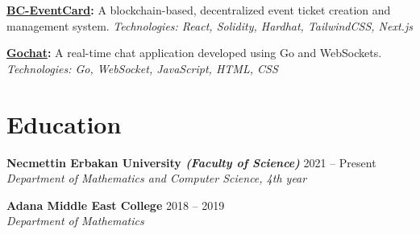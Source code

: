 \documentclass[10pt,a4paper]{extarticle}
\begin{document}
\vspace{5pt}
\noindent\textbf{\href{https://github.com/faust-lvii/BC-EventCard}{BC-EventCard}:} A blockchain-based, decentralized event ticket creation and management system. \textit{Technologies: React, Solidity, Hardhat, TailwindCSS, Next.js}

\vspace{5pt}
\noindent\textbf{\href{https://github.com/faust-lvii/gochat}{Gochat}:} A real-time chat application developed using Go and WebSockets. \textit{Technologies: Go, WebSocket, JavaScript, HTML, CSS}

\vspace{10pt}

\section{Education}
\textbf{Necmettin Erbakan University \textit{(Faculty of Science)}} \hfill 2021 -- Present\\
\textit{Department of Mathematics and Computer Science, 4th year}

\vspace{5pt}
\noindent\textbf{Adana Middle East College} \hfill 2018 -- 2019\\
\textit{Department of Mathematics}
\end{document}
